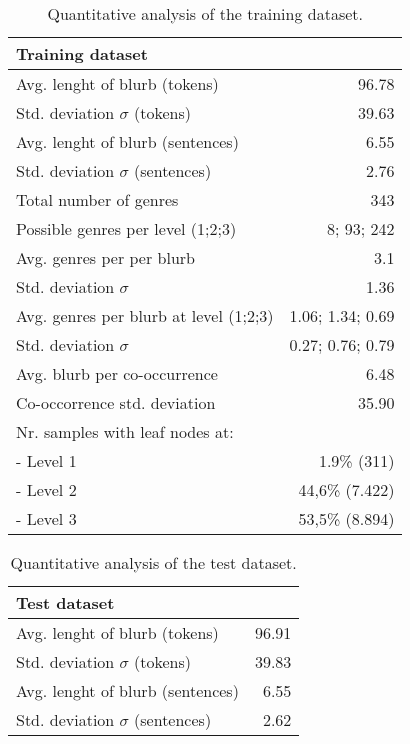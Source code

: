 \documentclass[11pt]{article}
\begin{document}
\begin{table}
\small
\begin{center}
\begin{tabular}{|l|r|}
\hline\centering\textbf{Training dataset}  &                    \\
\hline
Avg. lenght of blurb (tokens)              &  96.78             \\
Std. deviation $\sigma$ (tokens)           &  39.63             \\
Avg. lenght of blurb (sentences)           &  6.55              \\
Std. deviation $\sigma$ (sentences)        &  2.76              \\
\hline
Total number of genres                     &  343               \\
Possible genres per level (1;2;3)          &  8; 93; 242        \\
Avg. genres per per blurb                  &  3.1               \\
Std. deviation $\sigma$                    &  1.36              \\
Avg. genres per blurb at level (1;2;3)     &  1.06; 1.34; 0.69  \\
Std. deviation $\sigma$                    &  0.27; 0.76; 0.79  \\
\hline
Avg. blurb per co-occurrence               &  6.48              \\
Co-occorrence std. deviation               & 35.90              \\
Nr. samples with leaf nodes at:            &                    \\
 - Level 1                                 & 1.9\% (311)        \\
 - Level 2                                 & 44,6\% (7.422)     \\
 - Level 3                                 & 53,5\% (8.894)     \\
\hline
\end{tabular}
\end{center}
\caption{\label{quantitivy-analysis-train}Quantitative analysis of the training dataset.}
\end{table}


\begin{table}
\small
\begin{center}
\begin{tabular}{|l|r|}
\hline\centering\textbf{Test dataset}  &         \\
\hline
Avg. lenght of blurb (tokens)              &  96.91             \\
Std. deviation $\sigma$ (tokens)           &  39.83             \\
Avg. lenght of blurb (sentences)           &  6.55              \\
Std. deviation $\sigma$ (sentences)        &  2.62              \\
\hline
\end{tabular}
\end{center}
\caption{\label{quantitivy-analysis-test}Quantitative analysis of the test dataset.}
\end{table}
\end{document}
